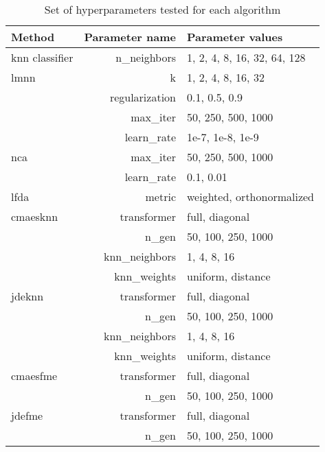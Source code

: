 \begin{table}[ht] \centering
\begin{tabular}{lrl}
\hline
Method & Parameter name & Parameter values \\
\hline

\ac{knn} classifier
    & n\_neighbors & 1, 2, 4, 8, 16, 32, 64, 128  \\
\ac{lmnn}
    & k & 1, 2, 4, 8, 16, 32  \\
    & regularization & 0.1, 0.5, 0.9  \\
    & max\_iter & 50, 250, 500, 1000  \\
    & learn\_rate & 1e-7, 1e-8, 1e-9  \\
\ac{nca}
    & max\_iter & 50, 250, 500, 1000  \\
    & learn\_rate & 0.1, 0.01  \\

\ac{lfda}
    & metric & weighted, orthonormalized  \\

\ac{cmaesknn}
    & transformer & full, diagonal  \\
    & n\_gen & 50, 100, 250, 1000  \\
    & knn\_neighbors & 1, 4, 8, 16  \\
    & knn\_weights & uniform, distance  \\

\ac{jdeknn}
    & transformer & full, diagonal  \\
    & n\_gen & 50, 100, 250, 1000  \\
    & knn\_neighbors & 1, 4, 8, 16  \\
    & knn\_weights & uniform, distance  \\

\ac{cmaesfme}
    & transformer & full, diagonal  \\
    & n\_gen & 50, 100, 250, 1000  \\

\ac{jdefme}
    & transformer & full, diagonal  \\
    & n\_gen & 50, 100, 250, 1000  \\


\hline
\end{tabular}
\caption{Set of hyperparameters tested for each algorithm} \label{tab:hyperparams}
\end{table}
